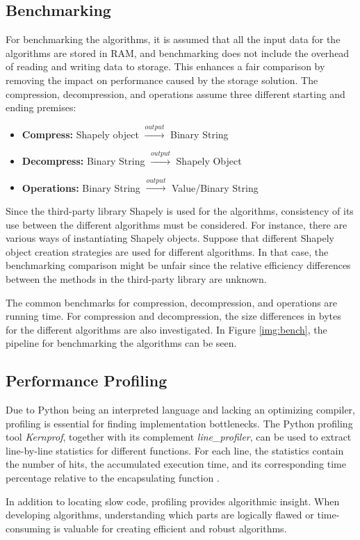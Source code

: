 \subsection{Benchmarking}
For benchmarking the algorithms, it is assumed that all the input data for the algorithms are stored in RAM, and benchmarking does not include the overhead of reading and writing data to storage. This enhances a fair comparison by removing the impact on performance caused by the storage solution. The compression, decompression, and operations assume three different starting and ending premises:
\begin{itemize}
    \item \textbf{Compress: }Shapely object $\xrightarrow{output}$ Binary String  
    \item \textbf{Decompress: }Binary String $\xrightarrow{output}$ Shapely Object    
    \item \textbf{Operations: }Binary String $\xrightarrow{output}$ Value/Binary String
\end{itemize}

Since the third-party library Shapely is used for the algorithms, consistency of its use between the different algorithms must be considered. For instance, there are various ways of instantiating Shapely objects. Suppose that different Shapely object creation strategies are used for different algorithms. In that case, the benchmarking comparison might be unfair since the relative efficiency differences between the methods in the third-party library are unknown.

The common benchmarks for compression, decompression, and operations are running time. For compression and decompression, the size differences in bytes for the different algorithms are also investigated.  In Figure \ref{img:bench}, the pipeline for benchmarking the algorithms can be seen.




\subsection{Performance Profiling}Due to Python being an interpreted language and lacking an optimizing compiler, profiling is essential for finding implementation bottlenecks. The Python profiling tool \emph{Kernprof}, together with its complement \emph{line\_profiler}, can be used to extract line-by-line statistics for different functions. For each line, the statistics contain the number of hits, the accumulated execution time, and its corresponding time percentage relative to the encapsulating function \cite{kernprof}.

In addition to locating slow code, profiling provides algorithmic insight. When developing algorithms, understanding which parts are logically flawed or time-consuming is valuable for creating efficient and robust algorithms. 


